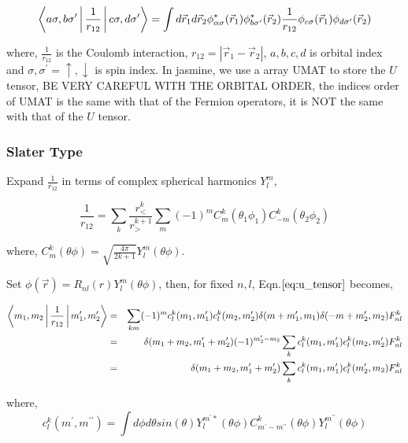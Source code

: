 \[
\]
\begin{equation}
\Braket{a\sigma,b\sigma^{\prime}|\frac{1}{r_{12}}|c\sigma,d\sigma^{\prime}}=\int d\vec{r}_{1}d\vec{r}_{2}\phi_{\alpha\sigma}^{*}(\vec{r}_{1})\phi_{b\sigma^{\prime}}^{*}(\vec{r}_{2})\frac{1}{r_{12}}\phi_{c\sigma}(\vec{r}_{1})\phi_{d\sigma^{\prime}}(\vec{r}_{2})\label{eq:u_tensor}
\end{equation}


where, $\frac{1}{r_{12}}$ is the Coulomb interaction, $r_{12}=|\vec{r}_{1}-\vec{r}_{2}|$,
$a,b,c,d$ is orbital index and $\sigma,\sigma^{\prime}=\uparrow,\downarrow$
is spin index. In jasmine, we use a array UMAT to store the $U$ tensor,
BE VERY CAREFUL WITH THE ORBITAL ORDER, the indices order of UMAT
is the same with that of the Fermion operators, it is NOT the same
with that of the $U$ tensor.


\subsubsection{Slater Type}

Expand $\frac{1}{r_{12}}$ in terms of complex spherical harmonics
$Y_{l}^{m}$,

\begin{equation}
\frac{1}{r_{12}}=\sum_{k}\frac{r_{<}^{k}}{r_{>}^{k+1}}\sum_{m}(-1)^{m}C_{m}^{k}(\theta_{1}\phi_{1})C_{-m}^{k}(\theta_{2}\phi_{2})
\end{equation}


where, $C_{m}^{k}(\theta\phi)=\sqrt{\frac{4\pi}{2k+1}}Y_{l}^{m}(\theta\phi)$.

Set $\phi(\vec{r})=R_{nl}(r)Y_{l}^{m}(\theta\phi)$, then, for fixed
$n,l$, Eqn.$\ref{eq:u_tensor}$ becomes,

\begin{eqnarray}
\Braket{m_{1},m_{2}|\frac{1}{r_{12}}|m_{1}^{\prime},m_{2}^{\prime}} & = & \sum_{km}(-1)^{m}c_{l}^{k}(m_{1},m_{1}^{\prime})c_{l}^{k}(m_{2},m_{2}^{\prime})\delta(m+m_{1}^{\prime},m_{1})\delta(-m+m_{2}^{\prime},m_{2})F_{nl}^{k}\nonumber \\
 & = & \delta(m_{1}+m_{2},m_{1}^{\prime}+m_{2}^{\prime})(-1)^{m_{2}^{\prime}-m_{2}}\sum_{k}c_{l}^{k}(m_{1},m_{1}^{\prime})c_{l}^{k}(m_{2},m_{2}^{\prime})F_{nl}^{k}\\
 & = & \delta(m_{1}+m_{2},m_{1}^{\prime}+m_{2}^{\prime})\sum_{k}c_{l}^{k}(m_{1},m_{1}^{\prime})c_{l}^{k}(m_{2}^{\prime},m_{2})F_{nl}^{k}\nonumber 
\end{eqnarray}


where, 
\begin{equation}
c_{l}^{k}(m^{\prime},m^{\prime\prime})=\int d\phi d\theta sin(\theta)Y_{l}^{m^{\prime}*}(\theta\phi)C_{m^{\prime}-m^{\prime\prime}}^{k}(\theta\phi)Y_{l}^{m^{\prime\prime}}(\theta\phi)
\end{equation}


